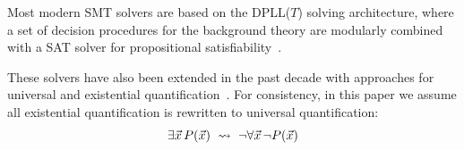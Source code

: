 \documentclass[oribibl]{llncs}
\begin{document}
Most modern SMT solvers are based on the DPLL($T$) solving architecture,
where a set of decision procedures for the background theory are modularly combined with a SAT solver for propositional satisfiability~\cite{nieuwenhuis2006solving}.

These solvers have also been extended 
in the past decade with approaches for universal and existential quantification~\cite{Detlefs03simplify:a,MouraBjoerner07,GeBarrettTinelli07}.
For consistency, in this paper we assume all existential quantification is rewritten to universal quantification:
\[
\exists \vec x\, P( \vec x ) \ \leadsto \  \neg \forall \vec x\, \neg P( \vec x )
\]
\end{document}

